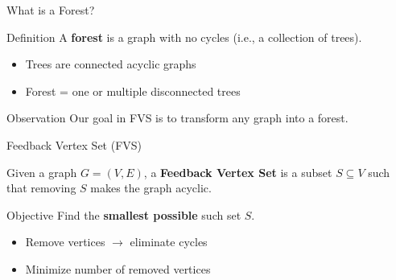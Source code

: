\documentclass[aspectratio=169]{beamer}
\begin{document}
\begin{frame}{What is a Forest?}

	\begin{block}{Definition}
		A \textbf{forest} is a graph with no cycles (i.e., a collection of trees).
	\end{block}

	\vspace{0.3cm}

	\begin{itemize}
		\item Trees are connected acyclic graphs
		\item Forest = one or multiple disconnected trees
	\end{itemize}

	\vspace{0.3cm}

	\begin{alertblock}{Observation}
		Our goal in FVS is to transform any graph into a forest.
	\end{alertblock}

\end{frame}

\begin{frame}{Feedback Vertex Set (FVS)}

	\begin{definition}
		Given a graph $G = (V, E)$, a \textbf{Feedback Vertex Set} is a subset $S \subseteq V$ such that removing $S$ makes the graph acyclic.
	\end{definition}

	\vspace{0.3cm}

	\begin{block}{Objective}
		Find the \textbf{smallest possible} such set $S$.
	\end{block}

	\vspace{0.3cm}

	\begin{itemize}
		\item Remove vertices $\rightarrow$ eliminate cycles
		\item Minimize number of removed vertices
	\end{itemize}

\end{frame}
\end{document}

